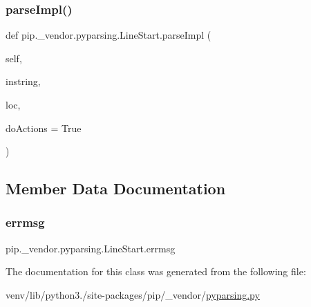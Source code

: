 \subsubsection{\texorpdfstring{parse\+Impl()}{parseImpl()}}
{\footnotesize\ttfamily def pip.\+\_\+vendor.\+pyparsing.\+Line\+Start.\+parse\+Impl (\begin{DoxyParamCaption}\item[{}]{self,  }\item[{}]{instring,  }\item[{}]{loc,  }\item[{}]{do\+Actions = {\ttfamily True} }\end{DoxyParamCaption})}



\subsection{Member Data Documentation}
\mbox{\label{classpip_1_1__vendor_1_1pyparsing_1_1LineStart_ad9b19c00c304ffb0a9ce78b48b151bd2}} 
\subsubsection{\texorpdfstring{errmsg}{errmsg}}
{\footnotesize\ttfamily pip.\+\_\+vendor.\+pyparsing.\+Line\+Start.\+errmsg}



The documentation for this class was generated from the following file\+:\begin{DoxyCompactItemize}
\item 
venv/lib/python3./site-\/packages/pip/\+\_\+vendor/\hyperlink{pip_2__vendor_2pyparsing_8py}{pyparsing.\+py}\end{DoxyCompactItemize}
